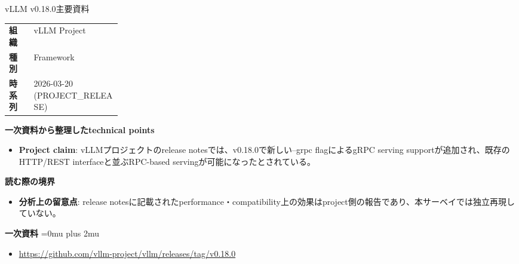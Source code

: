 \begin{technicalnote}{vLLM v0.18.0}{主要資料}
\begingroup
\begin{tabularx}{\linewidth}{@{}>{\bfseries}p{0.22\linewidth}X@{}}
組織 & vLLM Project \\
種別 & Framework \\
時系列 & 2026-03-20 (PROJECT\_RELEASE) \\
\end{tabularx}
\smallskip
{\bfseries 一次資料から整理したtechnical points}
\begin{itemize}[leftmargin=1.5em,itemsep=0.35em]
\item \textbf{Project claim}: vLLMプロジェクトのrelease notesでは、v0.18.0で新しい--grpc flagによるgRPC serving supportが追加され、既存のHTTP/REST interfaceと並ぶRPC-based servingが可能になったとされている。
\end{itemize}
\begin{minipage}{\linewidth}
{\bfseries 読む際の境界}
\begin{itemize}[leftmargin=1.5em,itemsep=0.35em]
\item \textbf{分析上の留意点}: release notesに記載されたperformance・compatibility上の効果はproject側の報告であり、本サーベイでは独立再現していない。
\end{itemize}
\begin{samepage}
{\bfseries 一次資料}
\begingroup\sloppy
\Urlmuskip=0mu plus 2mu\relax
\begin{itemize}[leftmargin=1.5em,itemsep=0.25em]
\item {\scriptsize\url{https://github.com/vllm-project/vllm/releases/tag/v0.18.0}}
\end{itemize}
\endgroup
\end{samepage}
\end{minipage}
\endgroup
\end{technicalnote}
\medskip

